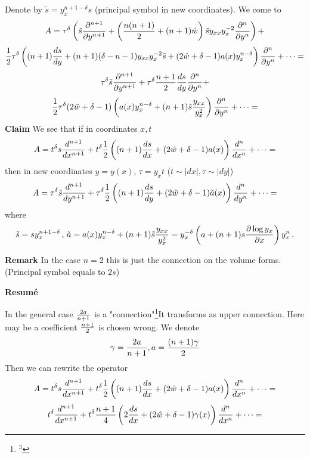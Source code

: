 Denote by $\tilde s=y_x^{n+1-\delta}s$ (principal symbol in new coordinates).
We come to 
              $$
    A=                 \tau^\delta
                          \left(
                          \tilde s{\partial ^{n+1}\over \partial y^{n+1}}+
                          \left({n(n+1)\over 2}+(n+1)\hat w\right)\tilde sy_{xx}y^{-2}_x
                          {\partial ^{n}\over \partial y^{n}}
                          \right)+
                        $$
                         $$
                                                {1\over 2}
        \tau^\delta
        \left(
        (n+1){ds\over dy}+
        (n+1)(\delta-n-1)y_{xx}y_x^{-2}\tilde s+
        (2\hat w+\delta-1)a(x)y_x^{n-\delta}
               \right)
         {\partial^n\over \partial y^n}
                 +\dots=
                         $$
                         $$
                         \tau^\delta
                          \tilde s{\partial ^{n+1}\over \partial y^{n+1}}+
        \tau^\delta {n+1\over 2}{ds\over dy}{\partial^n\over \partial y^n}+
                         $$
                         $$
                         {1\over 2}
        \tau^\delta
        (2\hat w+\delta-1)
        \left(
        a(x)y_x^{n-\delta}+(n+1)\tilde s{y_{xx}\over y_x^2}
        \right)
         {\partial^n\over \partial y^n}
                 +\dots=
                         $$
{\bf Claim}  We see that if in coordinates $x,t$
                 $$
A=t^\delta
    s{d^{n+1}\over dx^{n+1}}
        +t^\delta{1\over 2}
        \left(
        (n+1){ds\over dx}+
        (2\hat w+\delta-1)a(x)
               \right) {d^{n}\over dx^{n}}+
            \dots=
                 $$
then in new coordinates  $y=y(x)$, $\tau=y_xt$ ($t\sim |dx|, \tau\sim |dy|$)
              $$
          A=\tau^\delta
    \tilde s{d^{n+1}\over dy^{n+1}}
        +\tau^\delta{1\over 2}
        \left(
        (n+1){ds\over dy}+
        (2\hat w+\delta-1)\tilde a(x)
               \right) {d^{n}\over dy^{n}}+
            \dots=
              $$
  where
             $$
         \tilde s=sy_x^{n+1-\delta}\,,\,
               \tilde a=a(x)y_x^{n-\delta}+(n+1)\tilde s{y_{xx}\over y_x^2}=
               y_x^{-\delta}\left(a+(n+1)s{\partial \log y_x\over \partial x}\right)y_x^n\,.
                   $$

{\bf Remark} In the case $n=2$ this is just the connection on the volume forms. (Principal symbol equals to $2s$)

\medskip

{\bf Resum\'e }


In the general case $2a\over n+1$ is a "connection"\footnote{$^3$}{It transforms as upper connection. Here
 may be a coefficient $n+1\over 2$ is chosen wrong}. We denote
              $$
            \gamma={2a\over n+1}, a={(n+1)\gamma\over 2}
              $$
Then we can rewrite the operator
            $$
        A=t^\delta
    s{d^{n+1}\over dx^{n+1}}
        +t^\delta{1\over 2}
        \left(
        (n+1){ds\over dx}+
        (2\hat w+\delta-1)a(x)
               \right) {d^{n}\over dx^{n}}+
            \dots=
            $$
            $$
            t^\delta
      {d^{n+1}\over dx^{n+1}}
        +t^\delta{n+1\over 4}
        \left(
        2{ds\over dx}+
        (2\hat w+\delta-1)\gamma(x)
               \right) {d^{n}\over dx^{n}}+
            \dots=
                $$
\medskip



